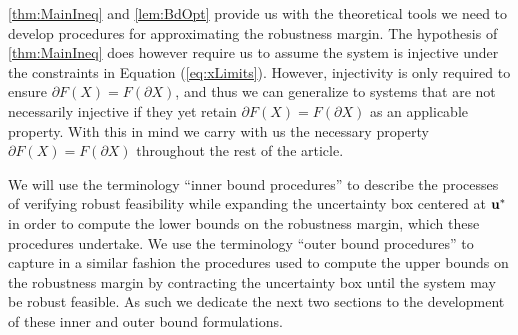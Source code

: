 \cref{thm:MainIneq} and \cref{lem:BdOpt} provide us with the theoretical tools we need to develop procedures for approximating the robustness margin.
The hypothesis of \cref{thm:MainIneq} does however require us to assume the system is injective under the constraints in Equation (\ref{eq:xLimits}).
However, injectivity is only required to ensure $\partial F(X) = F(\partial X)$, and thus we can generalize to systems that are not necessarily injective if they yet retain $\partial F(X) = F(\partial X)$ as an applicable property. 
With this in mind we carry with us the necessary property $\partial F(X) = F(\partial X)$ throughout the rest of the article. 

We will use the terminology \enquote{inner bound procedures} to describe the processes of verifying robust feasibility while expanding the uncertainty box centered at $\mathbf{u}^*$ in order to compute the lower bounds on the robustness margin, which these procedures undertake. 
We use the terminology \enquote{outer bound procedures} to capture in a similar fashion the procedures used to compute the upper bounds on the robustness margin by contracting the uncertainty box until the system may be robust feasible. 
As such we dedicate the next two sections to the development of these inner and outer bound formulations. 

